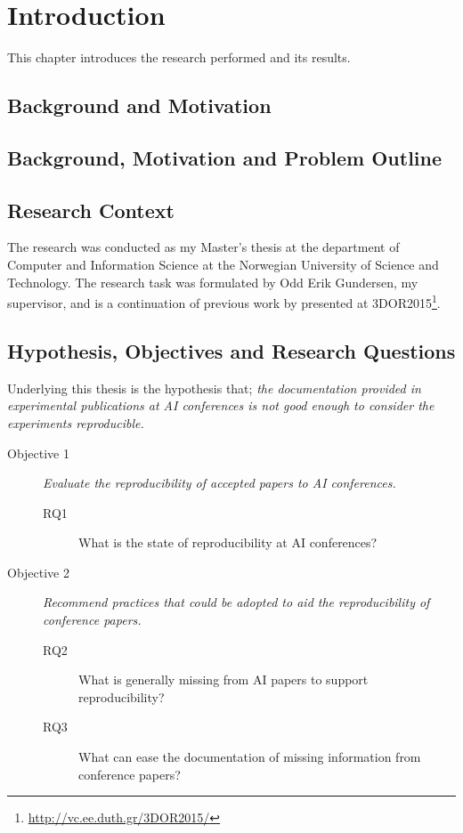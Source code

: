 
\chapter{Introduction}

This chapter introduces the research performed and its results.

\section{Background and Motivation}

\section{Background, Motivation and Problem Outline}
\section{Research Context}
The research was conducted as my Master's thesis at the department of Computer and Information Science at the Norwegian University of Science and Technology. The research task was formulated by Odd Erik Gundersen, my supervisor, and is a continuation of previous work by \citet{Gundersen2015} presented at 3DOR2015\footnote{\url{http://vc.ee.duth.gr/3DOR2015/}}.

\section{Hypothesis, Objectives and Research Questions}
Underlying this thesis is the hypothesis that; \textit{the documentation provided in experimental publications at AI conferences is not good enough to consider the experiments reproducible.}

\begin{description}
    \item[Objective 1] \textit{Evaluate the reproducibility of accepted papers to AI conferences.}
        \begin{description}
            \item[RQ1] What is the state of reproducibility at AI conferences?
        \end{description}
    \item[Objective 2] \textit{Recommend practices that could be adopted to aid the reproducibility of conference papers.}
        \begin{description}
            \item[RQ2] What is generally missing from AI papers to support reproducibility?
            \item[RQ3] What can ease the documentation of missing information from conference papers?
        \end{description}
\end{description}

